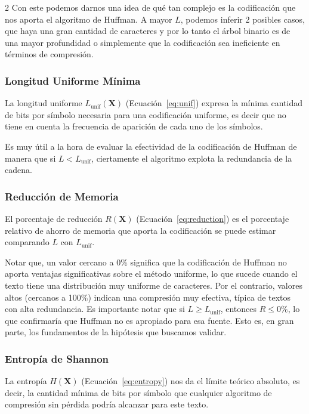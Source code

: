 \documentclass[a4paper, 10pt]{article}
\begin{document}
\begin{multicols}{2}
            Con este podemos darnos una idea de qué tan complejo es la codificación que nos aporta el algoritmo de Huffman. A mayor $L$, podemos inferir 2 posibles casos, que haya una gran cantidad de caracteres y por lo tanto el árbol binario es de una mayor profundidad o simplemente que la codificación sea ineficiente en términos de compresión.

        \subsubsection*{Longitud Uniforme Mínima}

            La longitud uniforme $L_{\text{unif}}(\mathbf{X})$ (Ecuación~\eqref{eq:unif}) expresa la mínima cantidad de bits por símbolo necesaria para una codificación uniforme, es decir que no tiene en cuenta la frecuencia de aparición de cada uno de los símbolos.

            Es muy útil a la hora de evaluar la efectividad de la codificación de Huffman de manera que si $L < L_\text{unif}$, ciertamente el algoritmo explota la redundancia de la cadena. 

        \subsubsection*{Reducción de Memoria}
        
            El porcentaje de reducción $R(\mathbf{X})$ (Ecuación~\eqref{eq:reduction}) es el porcentaje relativo de ahorro de memoria que aporta la codificación se puede estimar comparando $L$ con $L_\text{unif}$.
            
            Notar que, un valor cercano a 0\% significa que la codificación de Huffman no aporta ventajas significativas sobre el método uniforme, lo que sucede cuando el texto tiene una distribución muy uniforme de caracteres. Por el contrario, valores altos (cercanos a 100\%) indican una compresión muy efectiva, típica de textos con alta redundancia. Es importante notar que si $L \geq L_\text{unif}$, entonces $R \leq 0\%$, lo que confirmaría que Huffman no es apropiado para esa fuente. Esto es, en gran parte, los fundamentos de la hipótesis que buscamos validar.

        \subsubsection*{Entropía de Shannon}

            La entropía $H(\mathbf{X})$ (Ecuación~\eqref{eq:entropy}) nos da el límite teórico absoluto, es decir, la cantidad mínima de bits por símbolo que cualquier algoritmo de compresión sin pérdida podría alcanzar para este texto. 
            

\end{multicols}
\end{document}
